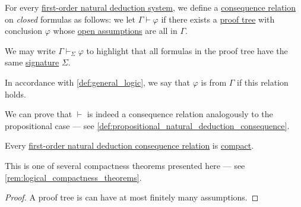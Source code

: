 \begin{definition}\label{def:fol_natural_deduction_consequence}\mimprovised
  For every \hyperref[def:fol_natural_deduction_system]{first-order natural deduction system}, we define a \hyperref[def:consequence_relation]{consequence relation} on \emph{closed} formulas as follows: we let \( \Gamma \vdash \varphi \) if there exists a \hyperref[def:fol_natural_deduction_proof_tree]{proof tree} with conclusion \( \varphi \) whose \hyperref[def:propositional_natural_deduction_proof_tree/open_assumptions]{open assumptions} are all in \( \Gamma \).

  We may write \( \Gamma \vdash_\Sigma \varphi \) to highlight that all formulas in the proof tree have the same \hyperref[def:fol_signature]{signature} \( \Sigma \).

  In accordance with \cref{def:general_logic}, we say that \( \varphi \) is  from \( \Gamma \) if this relation holds.
\end{definition}
\begin{defproof}
  We can prove that \( {\vdash} \) is indeed a consequence relation analogously to the propositional case --- see \cref{def:propositional_natural_deduction_consequence}.
\end{defproof}

\begin{proposition}\label{thm:fol_natural_deduction_derivation_compact}
  Every \hyperref[def:fol_natural_deduction_consequence]{first-order natural deduction consequence relation} is \hyperref[def:consequence_relation/compactness]{compact}.
\end{proposition}
\begin{comments}
  \item This is one of several compactness theorems presented here --- see \cref{rem:logical_compactness_theorems}.
\end{comments}
\begin{proof}
  A proof tree is can have at most finitely many assumptions.
\end{proof}

